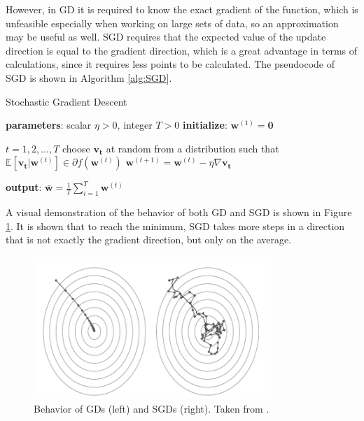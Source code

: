 However, in \ac{GD} it is required to know the exact gradient of the function, which is unfeasible especially when working on large sets of data, so an approximation may be useful as well. \ac{SGD} requires that the expected value of the update direction is equal to the gradient direction, which is a great advantage in terms of calculations, since it requires less points to be calculated. The pseudocode of \ac{SGD} is shown in Algorithm \ref{alg:SGD}.

\begin{algorithm}
	\caption{Stochastic Gradient Descent}\label{alg:SGD}
	\begin{algorithmic}[1]
		\State \textbf{parameters}: scalar $\eta > 0$, integer $T>0$
		\State \textbf{initialize}: $\mathbf{w}^{(1)} = \mathbf{0}$
		
		\For $t = 1, 2, \dots , T$
		\State choose $\mathbf{v_t}$ at random from a distribution such that $\mathbb{E}[\mathbf{v_t} | \mathbf{w}^{(t)}] \in \partial f(\mathbf{w}^{(t)})$
		\State $\mathbf{w}^{(t+1)} = \mathbf{w}^{(t)} - \eta \nabla \mathbf{v_t}$
		\EndFor
		
		\State \textbf{output}: $\mathbf{\bar{w}} = \frac{1}{T} \sum_{i=1}^{T} \mathbf{w}^{(t)}$
	\end{algorithmic}
\end{algorithm}

A visual demonstration of the behavior of both \ac{GD} and \ac{SGD} is shown in Figure \ref{fig:gd-sgd}. It is shown that to reach the minimum, \ac{SGD} takes more steps in a direction that is not exactly the gradient direction, but only on the average.


\begin{figure}[ht]
	\centering
	\includegraphics[width=0.8\textwidth]{figures/gd-sgd.png}
	\caption{Behavior of \aclp{GD} (left) and \aclp{SGD} (right). Taken from \cite{phdthesis}.}
	\label{fig:gd-sgd}
\end{figure}


